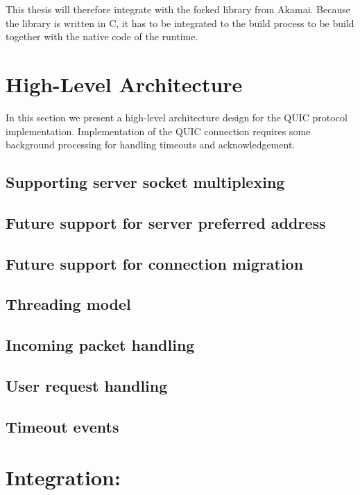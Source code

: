 This thesis will therefore integrate with the forked \libopenssl{} library from Akamai. Because the
library is written in C, it has to be integrated to the build process to be build together with the
native code of the \dotnet{} runtime.

\section{High-Level Architecture}

In this section we present a high-level architecture design for the QUIC protocol implementation.
Implementation of the QUIC connection requires some background processing for handling timeouts and
acknowledgement.


\subsection{Supporting server socket multiplexing}
\subsection{Future support for server preferred address}
\subsection{Future support for connection migration}
\subsection{Threading model}
\subsection{Incoming packet handling}
\subsection{User request handling}
\subsection{Timeout events}

\section{Integration:}



